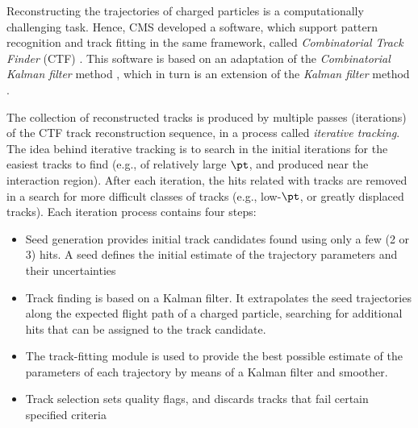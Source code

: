 Reconstructing the trajectories of charged particles is a computationally challenging task. Hence, CMS developed a software, which support pattern recognition and track fitting in the same framework, called \emph{Combinatorial Track Finder} (CTF) \cite{Chatrchyan:2014fea}.
This software is based on an adaptation of the \emph{Combinatorial Kalman filter} method \cite{Billoir:1989mh,Billoir:1990we,Mankel:1997dy}, which in turn is an extension of the \emph{Kalman filter} method \cite{Fruhwirth:1987fm}.  

The collection of reconstructed tracks is produced by multiple passes (iterations) of the CTF track
reconstruction sequence, in a process called \emph{iterative tracking}. 
The idea behind iterative tracking is to search in the initial iterations for the easiest tracks to find (e.g., of relatively large $\pt$, and produced near the interaction region). After each iteration, the hits related with tracks are removed in a search
for more difficult classes of tracks (e.g., low-$\pt$, or greatly displaced tracks).
Each iteration process contains four steps:

\begin{itemize}
\item 
Seed generation provides initial track candidates found using only a few (2 or 3) hits. A seed
defines the initial estimate of the trajectory parameters and their uncertainties
\item
Track finding is based on a Kalman filter. It extrapolates the seed trajectories along the
expected flight path of a charged particle, searching for additional hits that can be assigned
to the track candidate.
\item
The track-fitting module is used to provide the best possible estimate of the parameters of
each trajectory by means of a Kalman filter and smoother.
\item
Track selection sets quality flags, and discards tracks that fail certain specified criteria
\end{itemize}

